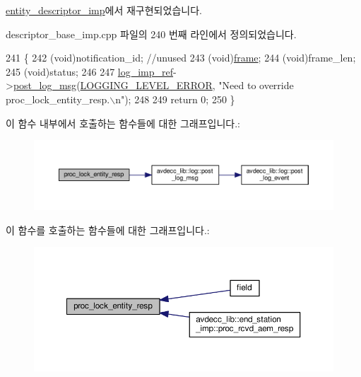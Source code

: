 \hyperlink{classavdecc__lib_1_1entity__descriptor__imp_a6cd2b73ea95b18f07dbdc251140679b0}{entity\+\_\+descriptor\+\_\+imp}에서 재구현되었습니다.



descriptor\+\_\+base\+\_\+imp.\+cpp 파일의 240 번째 라인에서 정의되었습니다.


\begin{DoxyCode}
241 \{
242     (void)notification\_id; \textcolor{comment}{//unused}
243     (void)\hyperlink{gst__avb__playbin_8c_ac8e710e0b5e994c0545d75d69868c6f0}{frame};
244     (void)frame\_len;
245     (void)status;
246 
247     \hyperlink{namespaceavdecc__lib_acbe3e2a96ae6524943ca532c87a28529}{log\_imp\_ref}->\hyperlink{classavdecc__lib_1_1log_a68139a6297697e4ccebf36ccfd02e44a}{post\_log\_msg}(\hyperlink{namespaceavdecc__lib_a501055c431e6872ef46f252ad13f85cdaf2c4481208273451a6f5c7bb9770ec8a}{LOGGING\_LEVEL\_ERROR}, \textcolor{stringliteral}{"Need to
       override proc\_lock\_entity\_resp.\(\backslash\)n"});
248 
249     \textcolor{keywordflow}{return} 0;
250 \}
\end{DoxyCode}


이 함수 내부에서 호출하는 함수들에 대한 그래프입니다.\+:
\nopagebreak
\begin{figure}[H]
\begin{center}
\leavevmode
\includegraphics[width=350pt]{classavdecc__lib_1_1descriptor__base__imp_a6cd2b73ea95b18f07dbdc251140679b0_cgraph}
\end{center}
\end{figure}




이 함수를 호출하는 함수들에 대한 그래프입니다.\+:
\nopagebreak
\begin{figure}[H]
\begin{center}
\leavevmode
\includegraphics[width=350pt]{classavdecc__lib_1_1descriptor__base__imp_a6cd2b73ea95b18f07dbdc251140679b0_icgraph}
\end{center}
\end{figure}


